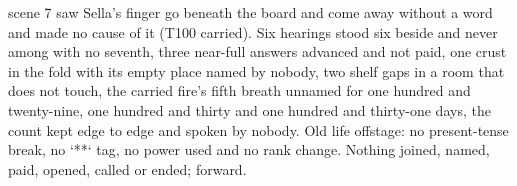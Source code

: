 \documentclass{design/chronicle}
\begin{document}
{\begin{itemize}[leftmargin=1.4em,itemsep=1pt,topsep=3pt,parsep=0pt]
scene 7 saw Sella’s finger go beneath the board and come away without a word and made no cause of it (T100 carried). Six hearings stood six beside and never among with no seventh, three near-full answers advanced and not paid, one crust in the fold with its empty place named by nobody, two shelf gaps in a room that does not touch, the carried fire’s fifth breath unnamed for one hundred and twenty-nine, one hundred and thirty and one hundred and thirty-one days, the count kept edge to edge and spoken by nobody. Old life offstage: no present-tense break, no `**` tag, no power used and no rank change. Nothing joined, named, paid, opened, called or ended; forward.

\end{itemize}

\begin{itemize}[leftmargin=1.4em,itemsep=1pt,topsep=3pt,parsep=0pt]


\end{itemize}}
\end{document}
